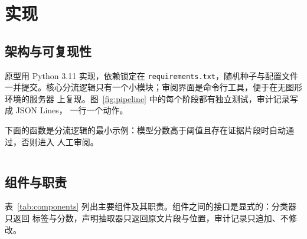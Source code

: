 \section{实现}
\label{sec:implementation}

\subsection{架构与可复现性}
\label{sec:architecture}

原型用 Python 3.11 实现，依赖锁定在 \texttt{requirements.txt}，随机种子与配置文件
一并提交。核心分流逻辑只有一个小模块；审阅界面是命令行工具，便于在无图形环境的服务器
上复现。图~\ref{fig:pipeline} 中的每个阶段都有独立测试，审计记录写成 JSON Lines，
一行一个动作。

下面的函数是分流逻辑的最小示例：模型分数高于阈值且存在证据片段时自动通过，否则进入
人工审阅。

\inputminted[fontsize=\footnotesize]{python}{code/example.py}

\subsection{组件与职责}
\label{sec:components}

表~\ref{tab:components} 列出主要组件及其职责。组件之间的接口是显式的：分类器只返回
标签与分数，声明抽取器只返回原文片段与位置，审计记录只追加、不修改。


